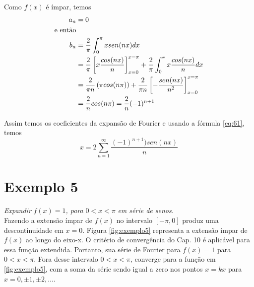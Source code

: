 Como $f(x)$ é ímpar, temos
\begin{equation}
    \notag
    \label{eq:exemplo4}
    \begin{split}
        a_n &= 0\\
        \text{e então}&\\
        b_n &= \dfrac{2}{\pi}\int_{0}^{\pi}x sen(nx)dx\\
        &= \dfrac{2}{\pi}\left[x \dfrac{cos(nx)}{n}\right]_{x=0}^{x=\pi} + \dfrac{2}{\pi}\int_{0}^{\pi}x \dfrac{cos(nx)}{n}dx\\
        &= \dfrac{2}{\pi n} \left(\pi cos(n\pi)\right) + \dfrac{2}{\pi n}\left[-\dfrac{sen(nx)}{n^2}\right]_{x=0}^{x=\pi}\\
        &= \dfrac{2}{n} cos(n\pi) = \dfrac{2}{n} (-1)^{n+1}
    \end{split}
\end{equation}

Assim temos os coeficientes da expansão de Fourier e usando a fórmula \ref{eq:61}, temos
\begin{equation}
    x = 2\sum\limits_{n=1}^{\infty}\dfrac{(-1)^{n + 1})sen(nx)}{n}
\end{equation}

\section*{Exemplo 5}
\textit{Expandir }$f(x) = 1$\textit{, para }$0 < x < \pi$\textit{ em série de senos.}\\

Fazendo a extensão ímpar de $f(x)$ no intervalo $[-\pi, 0]$ produz uma descontinuidade em 
$x = 0$. Figura \ref{fig:exemplo5} representa a extensão ímpar de $f(x)$ ao longo do eixo-x.
O critério de convergência do Cap. 10 é aplicável para essa função extendida. Portanto,
sua série de Fourier para $f(x) = 1$ para $0 < x < \pi$. Fora desse intervalo $0 < x < \pi$,
converge para a função em \ref{fig:exemplo5}, com a soma da série sendo igual a zero nos pontos
$x = kx$ para $x = 0, \pm 1, \pm 2, \ldots$.

